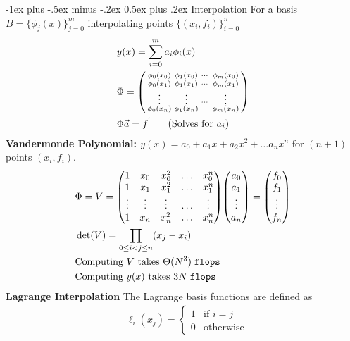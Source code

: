 \documentclass[letter, fleqn]{article}
\makeatletter
\renewcommand{\section}{\@startsection{section}{1}{0mm}%
{-1ex plus -.5ex minus -.2ex}%
{0.5ex plus .2ex}%
{\normalfont\large\bfseries}}
\newcommand{\flops}{\texttt{flops }}
\makeatother
\begin{document}
\begin{multicols}{3}
    \section{Interpolation}
    For a basis $B = \{\phi_j(x)\}_{j=0}^m$ interpolating points $\{(x_i, f_i)\}_{i=0}^n$ 
    \begin{align*}
        &y(x) = \sum_{i=0}^m a_i\phi_i(x)\\
        &\Phi = \smqty(
        \phi_0(x_0) & \phi_1(x_0) & \cdots &\phi_m(x_0) \\
        \phi_0(x_1) & \phi_1(x_1) & \cdots &\phi_m(x_1) \\
        \vdots & \vdots & \cdots & \vdots\\
        \phi_0(x_n) & \phi_1(x_n) & \cdots &\phi_m(x_n) \\
        )\\
        &\Phi \Vec{a} = \Vec{f} \tag{Solves for $a_i$}
    \end{align*}
    \textbf{Vandermonde Polynomial: $y(x) = a_0 + a_1x + a_2x^2 + \ldots a_nx^n$} for $(n+1)$ points $(x_i, f_i)$. 
    \begin{align*}
        &\Phi = V = \mqty(
        1 & x_0 & x_0^2 &\ldots & x_0^n\\
        1 & x_1 & x_1^2 &\ldots & x_1^n\\
        \vdots & \vdots & \vdots & \ldots &\vdots\\
        1 & x_n & x_n^2 & \ldots &x_n^n\\
        )\mqty(a_0 \\ a_1 \\ \vdots \\ a_n) = \mqty(f_0 \\ f_1 \\ \vdots \\ f_n)\\
        &\det(V) = \prod_{0\leq i < j \leq n}(x_j - x_i)\\
        &\text{Computing $V$ takes $\Theta(N^3) \;\flops$}\\
        &\text{Computing $y(x)$ takes $3N \;\flops$}
    \end{align*}
    \textbf{Lagrange Interpolation} The Lagrange basis functions are defined as
    \begin{align*}
        &\ell_i(x_j) = \begin{cases}
            1 & \text{if $i = j$}\\
            0 & \text{otherwise}
        \end{cases}\\

\end{align*}
\end{multicols}
\end{document}
